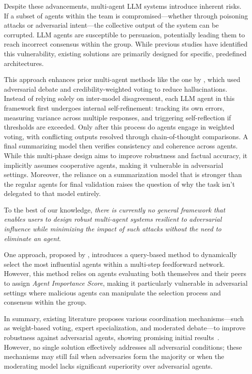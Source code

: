 Despite these advancements, multi-agent LLM systems introduce inherent risks. If a subset of agents within the team is compromised—whether through poisoning attacks or adversarial intent—the collective output of the system can be corrupted. LLM agents are susceptible to persuasion, potentially leading them to reach incorrect consensus within the group. While previous studies \cite{psysafe, multiagent-debate-attack, MALLM-survey-2} have identified this vulnerability, existing solutions are primarily designed for specific, predefined architectures. 


This approach enhances prior multi-agent methods like the one by \citet{w_based_voting}, which used adversarial debate and credibility-weighted voting to reduce hallucinations. Instead of relying solely on inter-model disagreement, each LLM agent in this framework first undergoes internal self-refinement: tracking its own errors, measuring variance across multiple responses, and triggering self-reflection if thresholds are exceeded. Only after this process do agents engage in weighted voting, with conflicting outputs resolved through chain-of-thought comparisons. A final summarizing model then verifies consistency and coherence across agents. While this multi-phase design aims to improve robustness and factual accuracy, it implicitly assumes cooperative agents, making it vulnerable in adversarial settings. Moreover, the reliance on a summarization model that is stronger than the regular agents for final validation raises the question of why the task isn’t delegated to that model entirely.


To the best of our knowledge, {\em there is currently no general framework that enables users to design robust multi-agent systems resilient to adversarial influence while minimizing the impact of such attacks without the need to eliminate an agent}.


One approach, proposed by \cite{DyLAN}, introduces a query-based method to dynamically select the most influential agents within a multi-step feedforward network. However, this method relies on agents evaluating both themselves and their peers to assign \textit{Agent Importance Score}, making it particularly vulnerable in adversarial settings where malicious agents can manipulate the selection process and consensus within the group. 

In summary, existing literature proposes various coordination mechanisms—such as weight-based voting, expert specialization, and moderated debate—to improve robustness against adversarial agents, showing promising initial results~\cite{w_based_voting, div-think-llms}. %
However, no single solution effectively addresses all adversarial conditions; these mechanisms may still fail when adversaries form the majority or when the moderating model lacks significant superiority over adversarial agents.


